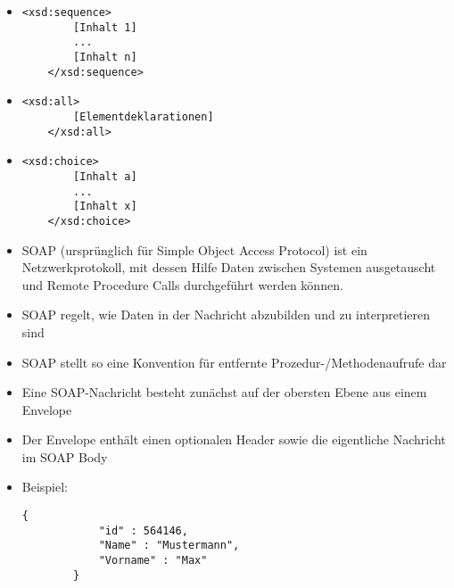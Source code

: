 \begin{itemize}
    \item
    \lstset{language=XML, breaklines=true}
    \begin{lstlisting}[label={lst:lstlisting7}]
    <xsd:sequence>
        [Inhalt 1]
        ...
        [Inhalt n]
    </xsd:sequence>
    \end{lstlisting}
    \item
    \lstset{language=XML, breaklines=true}
    \begin{lstlisting}[label={lst:lstlisting8}]
    <xsd:all>
        [Elementdeklarationen]
    </xsd:all>
    \end{lstlisting}
    \item
    \lstset{language=XML, breaklines=true}
    \begin{lstlisting}[label={lst:lstlisting9}]
    <xsd:choice>
        [Inhalt a]
        ...
        [Inhalt x]
    </xsd:choice>
    \end{lstlisting}
\end{itemize}

\begin{itemize}
    \item SOAP (ursprünglich für Simple Object Access Protocol) ist ein Netzwerkprotokoll, mit dessen Hilfe Daten zwischen Systemen ausgetauscht und Remote Procedure Calls durchgeführt werden können.
    \item SOAP regelt, wie Daten in der Nachricht abzubilden und zu interpretieren sind
    \item SOAP stellt so eine Konvention für entfernte Prozedur-/Methodenaufrufe dar
    \item Eine SOAP-Nachricht besteht zunächst auf der obersten Ebene aus einem Envelope
    \item Der Envelope enthält einen optionalen Header sowie die eigentliche Nachricht im SOAP Body
\end{itemize}

\begin{itemize}
    \item Beispiel:
    \begin{lstlisting}[label={lst:lstlisting10}]
        {
            "id" : 564146,
            "Name" : "Mustermann",
            "Vorname" : "Max"
        }
    \end{lstlisting}
\end{itemize}